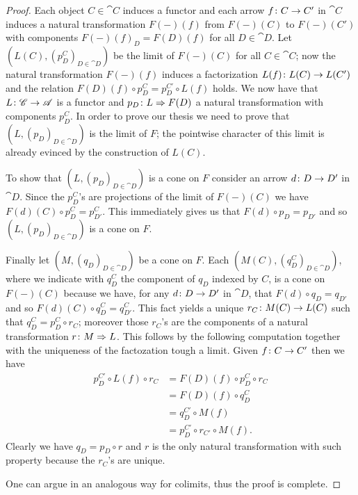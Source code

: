 \begin{proof}
  Each object \(C\in\cat{C}\) induces a functor
  and each arrow \(f\colon C\to C'\) in \(\cat{C}\) induces a natural transformation \(F(-)(f)\) from \(F(-)(C)\) to \(F(-)(C')\) with components \(F(-)(f)_D = F(D)(f)\) for all \(D\in\cat{D}\). Let \((L(C), (p^C_D)_{D\in\cat{D}})\) be the limit of \(F(-)(C)\) for all \(C\in\cat{C}\); now the natural transformation \(F(-)(f)\) induces a factorization \(L(f)\colon L(C)\to L(C')\) and the relation \(F(D)(f)\circ p^C_D = p^{C'}_D\circ L(f)\) holds. We now have that \(L\colon {\mathscr C}\to {\mathscr A}\) is a functor and \(p_D\colon L\Rightarrow F(D)\) a natural transformation with components \(p^C_D\). In order to prove our thesis we need to prove that \((L, (p_D)_{D\in\cat{D}})\) is the limit of \(F\); the pointwise character of this limit is already evinced by the construction of \(L(C)\).

  To show that \((L, (p_D)_{D\in\cat{D}})\) is a cone on \(F\) consider an arrow \(d\colon D\to D'\) in \(\cat{D}\). Since the \(p^C_D\)'s are projections of the limit of \(F(-)(C)\) we have \(F(d)(C)\circ p^C_D=p^C_{D'}\). This immediately gives us that \(F(d)\circ p_D = p_{D'}\) and so \((L, (p_D)_{D\in\cat{D}})\) is a cone on \(F\).

  Finally let \((M, (q_D)_{D\in\cat{D}})\) be a cone on \(F\). Each \((M(C), (q^C_D)_{D\in\cat{D}})\), where we indicate with \(q^C_D\) the component of \(q_D\) indexed by \(C\), is a cone on \(F(-)(C)\) because we have, for any \(d\colon D\to D'\) in \(\cat{D}\), that \(F(d)\circ q_D = q_{D'}\) and so \(F(d)(C)\circ q^C_D = q^C_{D'}\). This fact yields a unique \(r_C\colon M(C)\to L(C)\) such that \(q^C_D = p^C_D\circ r_C\); moreover those \(r_C\)'s are the components of a natural transformation \(r\colon M\Rightarrow L\). This follows by the following computation together with the uniqueness of the factozation tough a limit. Given \(f\colon C\to C'\) then we have
  \begin{align*}
    p^{C'}_D\circ L(f)\circ r_C &= F(D)(f)\circ p^C_D\circ r_C\\
                             &= F(D)(f)\circ q^C_D\\
                             &= q^{C'}_D\circ M(f)\\
                             &= p^{C'}_D\circ r_{C'}\circ M(f).
  \end{align*}
  Clearly we have \(q_D=p_D\circ r\) and \(r\) is the only natural transformation with such property because the \(r_C\)'s are unique.

  One can argue in an analogous way for colimits, thus the proof is complete.
\end{proof}

